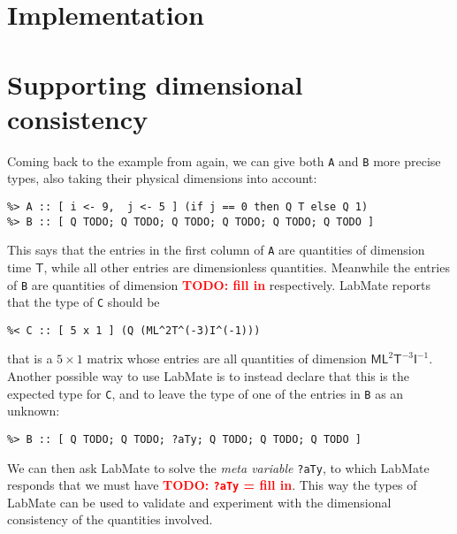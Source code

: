 \documentclass{ws-procs9x6}
\newcommand{\remph}{\emph}
\newcommand{\todo}[1]{\textcolor{red}{\textbf{TODO: #1}}}
\begin{document}

\section{Implementation}




\section{Supporting dimensional consistency}
\label{sec:example-revisited}


Coming back to the example from  again, we can give both \texttt{A} and \texttt{B} more precise types, also taking their physical dimensions into account:
\begin{verbatim}
%> A :: [ i <- 9,  j <- 5 ] (if j == 0 then Q T else Q 1)
%> B :: [ Q TODO; Q TODO; Q TODO; Q TODO; Q TODO; Q TODO ]
\end{verbatim}
This says that the entries in the first column of \texttt{A} are quantities of dimension time $\mathsf{T}$, while all other entries are dimensionless quantities. Meanwhile the entries of \texttt{B} are quantities of dimension \todo{fill in} respectively. LabMate reports that the type of \texttt{C} should be
\begin{verbatim}
%< C :: [ 5 x 1 ] (Q (ML^2T^(-3)I^(-1)))
\end{verbatim}
that is a $5 \times 1$ matrix whose entries are all quantities of dimension $\mathsf{ML}^2\mathsf{T}^{-3}\mathsf{I}^{-1}$. Another possible way to use LabMate is to instead declare that this is the expected type for \texttt{C}, and to leave the type of one of the entries in \texttt{B} as an unknown:
\begin{verbatim}
%> B :: [ Q TODO; Q TODO; ?aTy; Q TODO; Q TODO; Q TODO ]
\end{verbatim}
We can then ask LabMate to solve the \remph{meta variable} \texttt{?aTy}, to which LabMate responds that we must have \todo{\texttt{?aTy} = fill in}. This way the types of LabMate can be used to validate and experiment with the dimensional consistency of the quantities involved.

\end{document}
